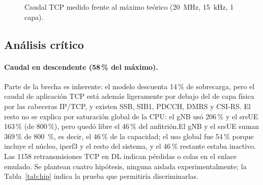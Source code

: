 \documentclass[conference]{IEEEtran}
\begin{document}
\begin{figure}[!t]
\centering
{}
\caption{Caudal TCP medido frente al máximo teórico (20~MHz, 15~kHz, 1 capa).}
\label{fig:graf}
\end{figure}

\subsection{Análisis crítico}
\paragraph{Caudal en descendente (58\,\% del máximo).} Parte de la brecha es inherente: el modelo descuenta 14\,\% de sobrecarga, pero el caudal de aplicación TCP está además ligeramente por debajo del de capa física por las cabeceras IP/TCP, y existen SSB, SIB1, PDCCH, DMRS y CSI-RS. El resto no se explica por saturación global de la CPU: el gNB usó 206\,\% y el srsUE 163\,\% (de 800\,\%), pero quedó libre el 46\,\% del anfitrión.El gNB y el srsUE suman 369\,\% de 800 \,\%, es decir, el 46\,\% de la capacidad; el uso global fue 54\,\% porque incluye el núcleo, iperf3 y el resto del sistema, y el 46\,\% restante estaba inactivo. Las 1158 retransmisiones TCP en DL indican pérdidas o colas en el enlace emulado. Se plantean cuatro hipótesis, ninguna aislada experimentalmente; la Tabla~\ref{tab:hip} indica la prueba que permitiría discriminarlas.
\end{document}
